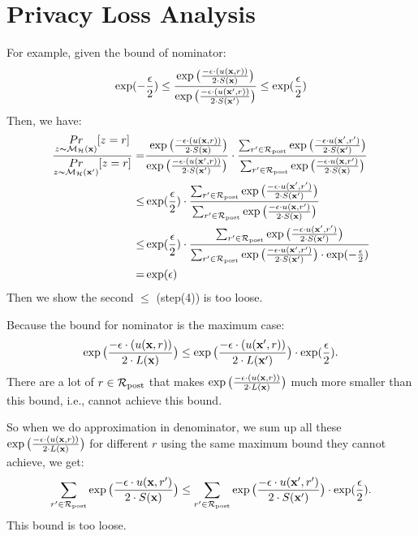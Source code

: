 \documentclass{article}
\begin{document}
\section{Privacy Loss Analysis}


For example, given the bound of nominator:
$$
\exp(-\frac{\epsilon}{2}) \leq \frac {
\exp\big(
  \frac{-\epsilon\cdot(\ux{r})}{2\cdot S(\dataobs)}
  \big)}
  {\exp\big(
  \frac
  {-\epsilon\cdot(\uxadj{r})}{2\cdot S(\dataobs')}
  \big)}
\leq \exp(\frac{\epsilon}{2})
$$
Then, we have:
\begin{align}
\frac{\hexpmechPr{\dataobs}{z = r}}{\hexpmechPr{\dataobs'}{z = r}}
= & \frac {\
  \exp\big(
  \frac{-\epsilon\cdot(\ux{r})}{2\cdot S(\dataobs)}
  \big)}
  {\exp\big(
  \frac
  {-\epsilon\cdot(\uxadj{r})}{2\cdot S(\dataobs')}
  \big)} 
  \cdot
  \frac{\unomalizer{\dataobs'}}{\unomalizer{\dataobs}}
  \\
	\leq & \exp(\frac{\epsilon}{2}) 
	\cdot 
	\frac{\unomalizer{\dataobs'}}
	{\unomalizer{\dataobs}}\\
	\leq & \exp(\frac{\epsilon}{2}) 
	\cdot 
	\frac{\unomalizer{\dataobs'}}
	{\unomalizer{\dataobs'}\cdot \exp(-\frac{\epsilon}{2})}\\
	= & \exp(\epsilon)
\end{align}
Then we show the second $\leq$ (step(4)) is too loose.

Because the bound for nominator is the maximum case: 
$$ \exp\big(
  \frac{-\epsilon\cdot(\ux{r})}{2\cdot L(\dataobs)}
  \big)
  \leq
  \exp\big(
  \frac{-\epsilon\cdot(\uxadj{r})}{2\cdot L(\dataobs')}
  \big) 
  \cdot \exp(\frac{\epsilon}{2}).$$
  There are a lot of $r \in \candidateset$ that makes $\exp\big(
  \frac{-\epsilon\cdot(\ux{r})}{2\cdot L(\dataobs)}
  \big)$ much more smaller than this bound, i.e., cannot achieve this bound.

  So when we do approximation in denominator, we sum up all these 
  $\exp\big( \frac{-\epsilon\cdot(\ux{r})}{2\cdot L(\dataobs)} \big)$
  for different $r$ using the same maximum bound they cannot achieve, we get: 
  $$
 \unomalizer{\dataobs}
	\leq
\unomalizer{\dataobs'}\cdot \exp(\frac{\epsilon}{2}).
  $$
  This bound is too loose.

  
\end{document}
